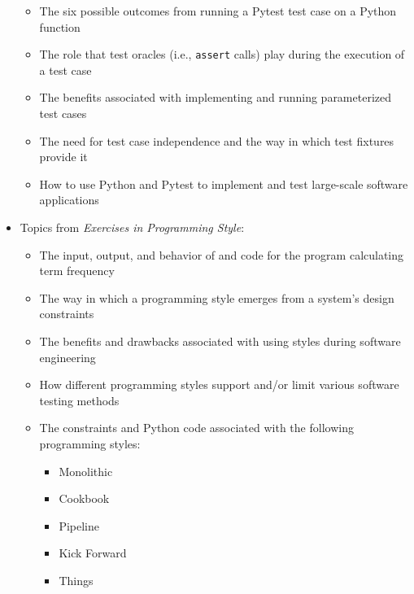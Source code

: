 \documentclass[11pt]{article}
\newcommand{\programmingstyle}{{\em Exercises in Programming Style\/}}
\newcommand{\program}[1]{\lstinline{#1}}
\begin{document}
\begin{itemize}
\begin{itemize}
      \item The six possible outcomes from running a Pytest test case on a
        Python function

      \item The role that test oracles (i.e., \program{assert} calls) play
        during the execution of a test case

      \item The benefits associated with implementing and running parameterized
        test cases

      \item The need for test case independence and the way in which test
        fixtures provide it

      \item How to use Python and Pytest to implement and test large-scale
        software applications

    \end{itemize}

  \item Topics from \programmingstyle{}:
    \vspace*{-.05in}
    \begin{itemize}

      \itemsep 0.025in

      \item The input, output, and behavior of and code for the program
        calculating term frequency

      \item The way in which a programming style emerges from a system's design constraints

      \item The benefits and drawbacks associated with using styles during
        software engineering

      \item How different programming styles support and/or limit various
        software testing methods

      \item The constraints and Python code associated with the following
        programming styles:

        \begin{itemize}
          \itemsep 0.025in
          \item Monolithic
          \item Cookbook
          \item Pipeline
          \item Kick Forward
          \item Things
        \end{itemize}

    \end{itemize}

\end{itemize}
\end{document}
